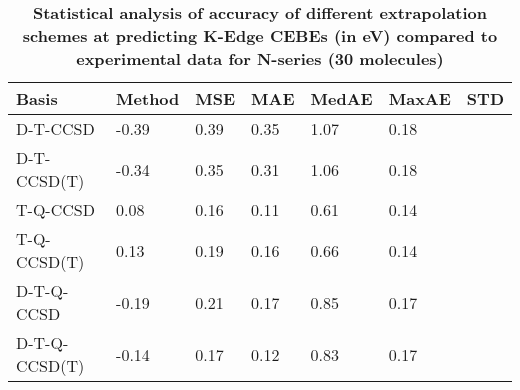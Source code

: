 \begin{table}
  \caption{\textbf{Statistical analysis of accuracy of different extrapolation schemes at predicting K-Edge CEBEs (in eV) compared to experimental data for N-series (30 molecules)}}
  \begin{tabular}{l l l l l l l }
    \toprule
    \textbf{Basis} & \textbf{Method} & \textbf{MSE} & \textbf{MAE} & \textbf{MedAE} & \textbf{MaxAE} & \textbf{STD} \\ 
    \midrule
    D-T-CCSD & -0.39 & 0.39 & 0.35 & 1.07 & 0.18 \\ 
    D-T-CCSD(T) & -0.34 & 0.35 & 0.31 & 1.06 & 0.18 \\ 
    T-Q-CCSD & 0.08 & 0.16 & 0.11 & 0.61 & 0.14 \\ 
    T-Q-CCSD(T) & 0.13 & 0.19 & 0.16 & 0.66 & 0.14 \\ 
    D-T-Q-CCSD & -0.19 & 0.21 & 0.17 & 0.85 & 0.17 \\ 
    D-T-Q-CCSD(T) & -0.14 & 0.17 & 0.12 & 0.83 & 0.17 \\ 
    \bottomrule
  \end{tabular}
\end{table}
